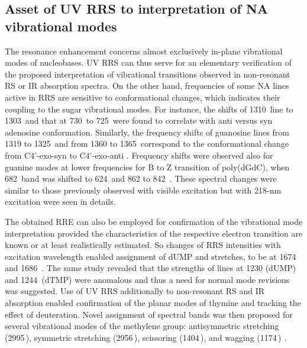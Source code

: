\subsection{Asset of UV RRS to interpretation of NA vibrational modes}

The resonance enhancement concerns almost exclusively in-plane vibrational
modes of nucleobases.
UV RRS can thus serve for an elementary verification of the proposed
interpretation of vibrational transitions observed in non-resonant RS or IR
absorption spectra.
On the other hand, frequencies of some NA lines active in RRS are sensitive to
conformational changes, which indicates their coupling to the sugar vibrational
modes.
For instance, the shifts of 1310\,\icm{} line to 1303\,\icm{} and that at
730\,\icm{} to 725\,\icm{} were found to correlate with anti versus syn
adenosine conformation.
Similarly, the frequency shifts of guanosine lines from 1319 to 1325\,\icm{}
and from 1360 to 1365\,\icm{} correspond to the conformational change from
C4'-exo-syn to C4'-exo-anti
\parencite{Nishimura1987}.
Frequency shifts were observed also for guanine modes at lower frequencies for
B to Z transition of poly(dGdC), when 682\,\icm{} band was shifted to
624\,\icm{} and 862 to 842\,\icm{}
\parencite{Fodor1986a}.
These spectral changes were similar to those previously observed with visible
excitation but with 218-nm excitation were seen in details.

The obtained RRE can also be employed for confirmation of the vibrational mode
interpretation provided the characteristics of the respective electron
transition are known or at least realistically estimated.
So changes of RRS intensities with excitation wavelength enabled assignment of
dUMP  and  stretches, to be at 1674 and
1686\,\icm{}
\parencite{Fodor1985}.
The same study revealed that the strengths of lines at 1230 (dUMP) and
1244\,\icm{} (dTMP) were anomalous and thus a need for normal mode revisions
was suggested.
Use of UV RRS additionally to non-resonant RS and IR absorption enabled
confirmation of the planar modes of thymine and tracking the effect of
deuteration.
Novel assignment of spectral bands was then proposed for several vibrational
modes of the methylene group:  antisymmetric stretching
(2995\,\icm{}), symmetric stretching (2956\,\icm{}), scissoring (1404\,\icm{}),
and wagging (1174\,\icm{})
\parencite{Tsuboi1997}.


